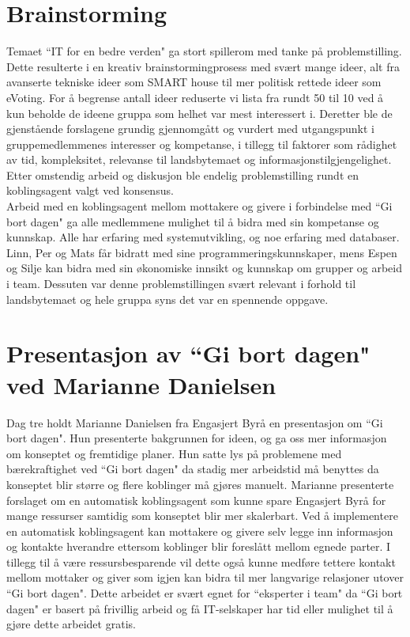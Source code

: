 \section{Brainstorming}
Temaet ``IT for en bedre verden" ga stort spillerom med tanke på problemstilling. Dette resulterte i en kreativ brainstormingprosess med svært mange ideer, alt fra avanserte tekniske ideer som SMART house til mer politisk rettede ideer som eVoting. For å begrense antall ideer reduserte vi lista fra rundt 50 til 10 ved å kun beholde de ideene gruppa som helhet var mest interessert i. Deretter ble de gjenstående forslagene grundig gjennomgått og vurdert med utgangspunkt i gruppemedlemmenes interesser og kompetanse, i tillegg til faktorer som rådighet av tid, kompleksitet, relevanse til landsbytemaet og informasjonstilgjengelighet. Etter omstendig arbeid og diskusjon ble endelig problemstilling rundt en koblingsagent valgt ved konsensus.\\

Arbeid med en koblingsagent mellom mottakere og givere i forbindelse med ``Gi bort dagen" ga alle medlemmene mulighet til å bidra med sin kompetanse og kunnskap. Alle har erfaring med systemutvikling, og noe erfaring med databaser. Linn, Per og Mats får bidratt med sine programmeringskunnskaper, mens Espen og Silje kan bidra med sin økonomiske innsikt og kunnskap om grupper og arbeid i team. Dessuten var denne problemstillingen svært relevant i forhold til landsbytemaet og hele gruppa syns det var en spennende oppgave.\\

\section{Presentasjon av ``Gi bort dagen" ved Marianne Danielsen}
Dag tre holdt Marianne Danielsen fra Engasjert Byrå en presentasjon om ``Gi bort dagen". Hun presenterte bakgrunnen for ideen, og ga oss mer informasjon om konseptet og fremtidige planer. Hun satte lys på problemene med bærekraftighet ved ``Gi bort dagen" da stadig mer arbeidstid må benyttes da konseptet blir større og flere koblinger må gjøres manuelt. Marianne presenterte forslaget om en automatisk koblingsagent som kunne spare Engasjert Byrå for mange ressurser samtidig som konseptet blir mer skalerbart. Ved å implementere en automatisk koblingsagent kan mottakere og givere selv legge inn informasjon og kontakte hverandre ettersom koblinger blir foreslått mellom egnede parter. I tillegg til å være ressursbesparende vil dette også kunne medføre tettere kontakt mellom mottaker og giver som igjen kan bidra til mer langvarige relasjoner utover ``Gi bort dagen". Dette arbeidet er svært egnet for ``eksperter i team" da ``Gi bort dagen" er basert på frivillig arbeid og få IT-selskaper har tid eller mulighet til å gjøre dette arbeidet gratis.\\

